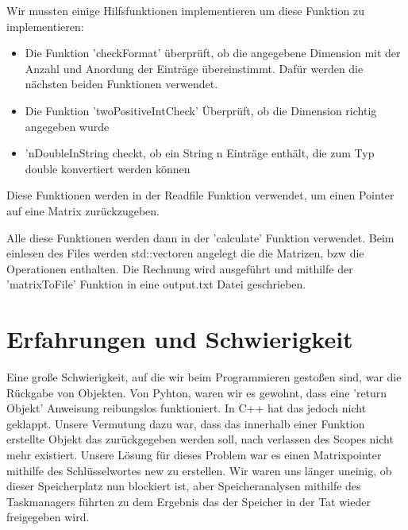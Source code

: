 \documentclass[a4paper]{article}
\begin{document}
\noindent
Wir mussten einige Hilfsfunktionen implementieren um diese Funktion zu implementieren:
\begin{itemize}
	\item Die Funktion 'checkFormat' überprüft, ob die angegebene Dimension mit der Anzahl und Anordung der Einträge übereinstimmt. Dafür werden die nächsten beiden Funktionen verwendet.
	\item Die Funktion 'twoPositiveIntCheck' Überprüft, ob die Dimension richtig angegeben wurde
	\item 'nDoubleInString checkt, ob ein String n Einträge enthält, die zum Typ double konvertiert werden können
\end{itemize}
Diese Funktionen werden in der Readfile Funktion verwendet, um einen Pointer auf eine Matrix zurückzugeben. \newline

\noindent
Alle diese Funktionen werden dann in der 'calculate' Funktion verwendet. Beim einlesen des Files werden std::vectoren angelegt die die Matrizen, bzw die Operationen enthalten. Die Rechnung wird ausgeführt und mithilfe der 'matrixToFile' Funktion in eine output.txt Datei geschrieben.

\section*{Erfahrungen und Schwierigkeit}

Eine große Schwierigkeit, auf die wir beim Programmieren gestoßen sind, war die Rückgabe von Objekten. Von Pyhton, waren wir es gewohnt, dass eine 'return Objekt' Anweisung reibungslos funktioniert. In C++ hat das jedoch nicht geklappt. Unsere Vermutung dazu war, dass das innerhalb einer Funktion erstellte Objekt das zurückgegeben werden soll, nach verlassen des Scopes nicht mehr existiert. Unsere Lösung für dieses Problem war es einen Matrixpointer mithilfe des Schlüsselwortes new zu erstellen. Wir waren uns länger uneinig, ob dieser Speicherplatz nun blockiert ist, aber Speicheranalysen mithilfe des Taskmanagers führten zu dem Ergebnis das der Speicher in der Tat  wieder freigegeben wird.
\end{document}
